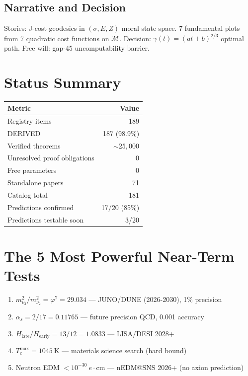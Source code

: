 \documentclass[12pt,a4paper]{article}
\theoremstyle{definition}
\theoremstyle{remark}
\begin{document}
\subsection{Narrative and Decision}

Stories: J-cost geodesics in $(\sigma, E, Z)$ moral state space.
7 fundamental plots from 7 quadratic cost functions on $\mathcal{M}$.
Decision: $\gamma(t) = (at+b)^{2/3}$ optimal path.
Free will: gap-45 uncomputability barrier.

\section{Status Summary}

\begin{center}
\begin{tabular}{lr}
\hline
\textbf{Metric} & \textbf{Value} \\
\hline
Registry items & 189 \\
DERIVED & 187 (98.9\%) \\
Verified theorems & $\sim 25{,}000$ \\
Unresolved proof obligations & 0 \\
Free parameters & 0 \\
Standalone papers & 71 \\
Catalog total & 181 \\
Predictions confirmed & 17/20 (85\%) \\
Predictions testable soon & 3/20 \\
\hline
\end{tabular}
\end{center}

\section{The 5 Most Powerful Near-Term Tests}

\begin{enumerate}
\item $m_{\nu_3}^2/m_{\nu_2}^2 = \varphi^7 = 29.034$ — JUNO/DUNE (2026-2030), 1\% precision
\item $\alpha_s = 2/17 = 0.11765$ — future precision QCD, 0.001 accuracy
\item $H_\mathrm{late}/H_\mathrm{early} = 13/12 = 1.0833$ — LISA/DESI 2028+
\item $T_c^\mathrm{max} = 1045~\mathrm{K}$ — materials science search (hard bound)
\item Neutron EDM $< 10^{-30}~e\cdot\mathrm{cm}$ — nEDM@SNS 2026+ (no axion prediction)
\end{enumerate}
\end{document}
